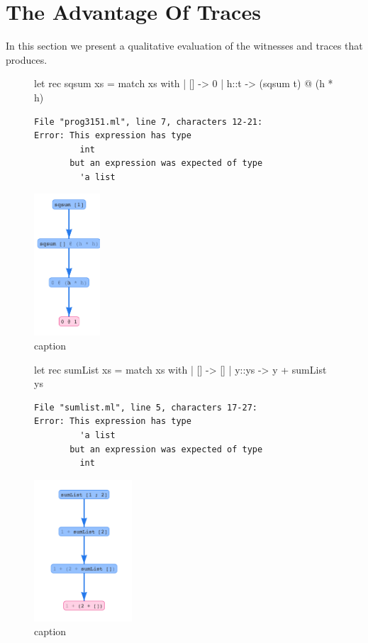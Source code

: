 \section{The Advantage Of Traces}
\label{sec:advantage-traces}
In this section we present a qualitative evaluation of the witnesses and
traces that \toolname produces.

\begin{figure}[ht]
\centering
\begin{minipage}{0.49\linewidth}
\centering
\begin{code}
let rec sqsum xs = match xs with
  | [] -> 0
  | h::t -> (sqsum t) @ (h * h)
\end{code}
\begin{verbatim}
File "prog3151.ml", line 7, characters 12-21:
Error: This expression has type
         int
       but an expression was expected of type
         'a list
\end{verbatim}
\end{minipage}
\begin{minipage}{0.49\linewidth}
\centering
\includegraphics[height=200px]{sqsum.png}
\end{minipage}
\caption{caption}
\label{fig:traces}
\end{figure}

\begin{figure}[ht]
\centering
\begin{minipage}{0.49\linewidth}
\centering
\begin{code}
let rec sumList xs = match xs with
  | []    -> []
  | y::ys -> y + sumList ys
\end{code}
\begin{verbatim}
File "sumlist.ml", line 5, characters 17-27:
Error: This expression has type
         'a list
       but an expression was expected of type
         int
\end{verbatim}
\end{minipage}
\begin{minipage}{0.49\linewidth}
\centering
\includegraphics[height=200px]{sumlist.png}
\end{minipage}
\caption{caption}
\label{fig:traces}
\end{figure}

